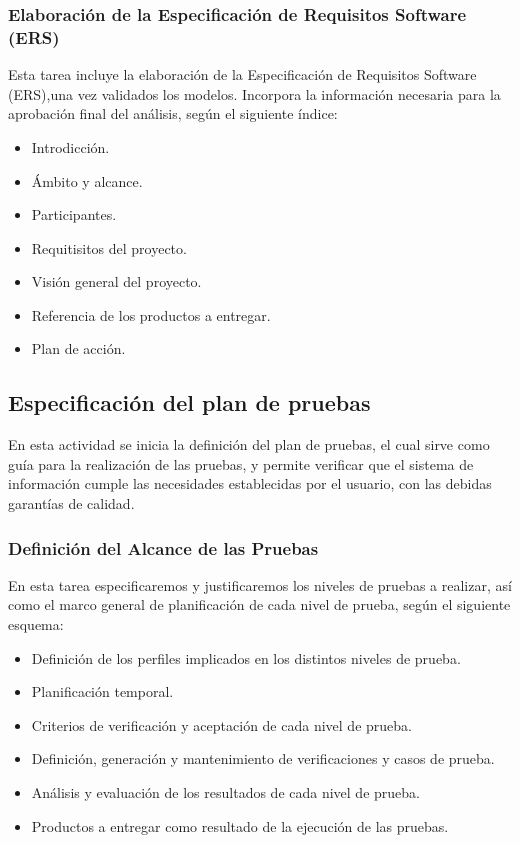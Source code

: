 \documentclass[11pt,a4paper,spanish,twoside]{report}
\begin{document}
\subsubsection{Elaboración de la Especificación de Requisitos Software (ERS)}
Esta tarea incluye la elaboración de la Especificación de Requisitos Software
(ERS),una vez validados los modelos. Incorpora la información necesaria para
la aprobación final del análisis, según el siguiente índice:
\begin{itemize}
\item Introdicción.
\item Ámbito y alcance.
\item Participantes.
\item Requitisitos del proyecto.
\item Visión general del proyecto.
\item Referencia de los productos a entregar.
\item Plan de acción.
\end{itemize}
 
\subsection{Especificación del plan de pruebas}
En esta actividad se inicia la definición del plan de pruebas, el cual sirve
como guía para la realización de las pruebas, y permite verificar que el
sistema de información cumple las necesidades establecidas por el usuario,
con las debidas garantías de calidad. 
\subsubsection{Definición del Alcance de las Pruebas}
En esta tarea especificaremos y justificaremos los niveles de pruebas a
realizar, así como el marco general de planificación de cada nivel de prueba,
según el siguiente esquema:
\begin{itemize}
\item Definición de los perfiles implicados en los distintos niveles de prueba.
\item Planificación temporal.
\item Criterios de verificación y aceptación de cada nivel de prueba.
\item Definición, generación y mantenimiento de verificaciones y casos de
  prueba.  
\item Análisis y evaluación de los resultados de cada nivel de prueba.
\item Productos a entregar como resultado de la ejecución de las pruebas.
\end{itemize}
\end{document}
